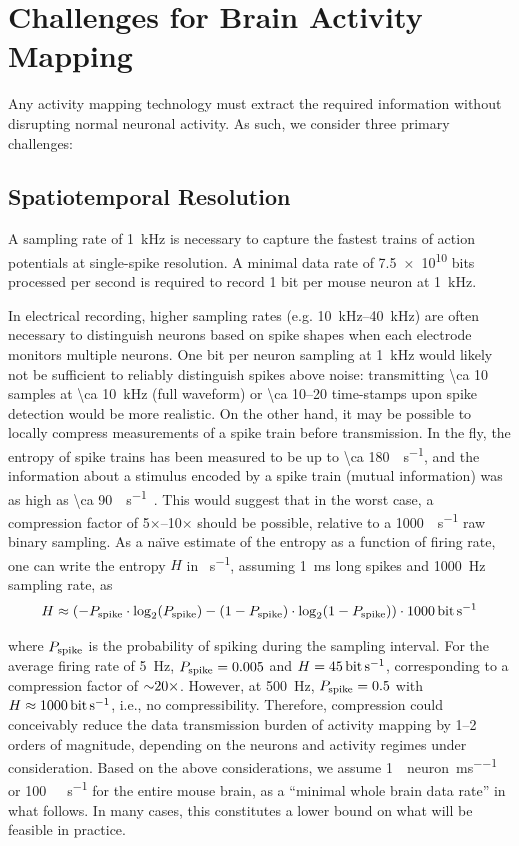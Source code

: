\section{Challenges for Brain Activity Mapping}
\label{sec:challenges}
Any activity mapping technology must extract the required information without disrupting normal neuronal activity.
As such, we consider three primary challenges:

\subsection{Spatiotemporal Resolution}

A sampling rate of \SI{1}{\kilo\hertz} is necessary to capture the fastest trains of action potentials at single-spike resolution.
A minimal data rate of \num{7.5e10} bits processed per second is required to record 1 bit per mouse neuron at \SI{1}{\kilo\hertz}.

In electrical recording, higher sampling rates (e.g. \SIrange{10}{40}{\kilo\hertz}) are often necessary to distinguish neurons based on spike shapes when each electrode monitors multiple neurons.
One bit per neuron sampling at \SI{1}{\kilo\hertz} would likely not be sufficient to reliably distinguish spikes above noise: transmitting \SI{\ca 10}{\bit} samples at \SI{\ca 10}{\kilo\hertz} (full waveform) or \SIrange{\ca 10}{20}{\bit} time-stamps upon spike detection would be more realistic.
On the other hand, it may be possible to locally compress measurements of a spike train before transmission.
In the fly, the entropy of spike trains has been measured to be up to \SI{\ca 180}{\bit\per\second}, and the information about a stimulus encoded by a spike train (mutual information) was as high as \SI{\ca 90}{\bit\per\second}~\cite{strong98}. This would suggest that in the worst case, a compression factor of 5$\times$--10$\times$ should be possible, relative to a \SI{1000}{\bit\per\second} raw binary sampling. As a na\"{\i}ve estimate of the entropy as a function of firing rate, one can write the entropy $H$ in \si{\bit\per\second}, assuming \SI{1}{\milli\second} long spikes and \SI{1000}{\hertz} sampling rate, as
\[H \approx \left(-P\sub{spike}\cdot\log_2\!\left(P\sub{spike}\right) - \left(1 - P\sub{spike}\right)\cdot\log_2\!\left(1 - P\sub{spike}\right)\right) \cdot \SI{1000}{\bit\per\second}\]

where $P_{\text{\scriptsize spike}}$ is the probability of spiking during the sampling interval.
For the average firing rate of \SI{5}{\hertz}, $P_{\text{\scriptsize spike}}=0.005$ and $H=\SI{45}{\bit\per\second}$, corresponding to a compression factor of ${\sim} 20\times$.
However, at \SI{500}{\hertz}, $P_{\text{\scriptsize spike}}=0.5$ with $H\approx\SI{1000}{\bit\per\second}$, i.e., no compressibility. 
Therefore, compression could conceivably reduce the data transmission burden of activity mapping by 1--2 orders of magnitude, depending on the neurons and activity regimes under consideration.
Based on the above considerations, we assume \SI{1}{\bit\per neuron\per\milli\second} or \SI{100}{\giga\bit\per\second} for the entire mouse brain, as a ``minimal whole brain data rate'' in what follows.
In many cases, this constitutes a lower bound on what will be feasible in practice.

